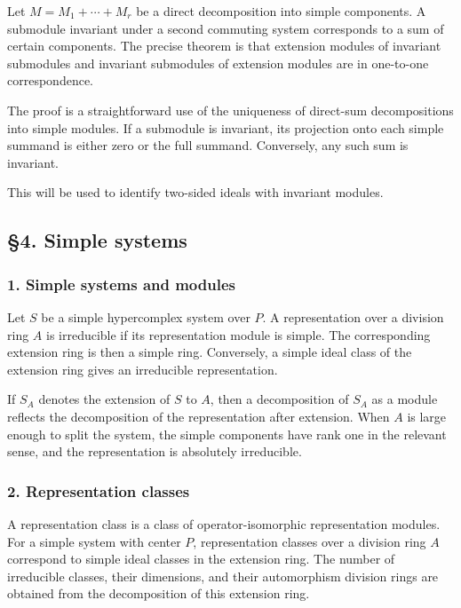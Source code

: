 \documentclass[11pt]{article}
\begin{document}
Let \(M=M_1+\cdots+M_r\) be a direct decomposition into simple
components. A submodule invariant under a second commuting system
corresponds to a sum of certain components. The precise theorem is that
extension modules of invariant submodules and invariant submodules of
extension modules are in one-to-one correspondence.

The proof is a straightforward use of the uniqueness of direct-sum
decompositions into simple modules. If a submodule is invariant, its
projection onto each simple summand is either zero or the full summand.
Conversely, any such sum is invariant.

This will be used to identify two-sided ideals with invariant modules.

\subsection{§4. Simple systems}\label{simple-systems}

\subsubsection{1. Simple systems and
modules}\label{simple-systems-and-modules}

Let \(S\) be a simple hypercomplex system over \(P\). A representation
over a division ring \(A\) is irreducible if its representation module
is simple. The corresponding extension ring is then a simple ring.
Conversely, a simple ideal class of the extension ring gives an
irreducible representation.

If \(S_A\) denotes the extension of \(S\) to \(A\), then a decomposition
of \(S_A\) as a module reflects the decomposition of the representation
after extension. When \(A\) is large enough to split the system, the
simple components have rank one in the relevant sense, and the
representation is absolutely irreducible.

\subsubsection{2. Representation classes}\label{representation-classes}

A representation class is a class of operator-isomorphic representation
modules. For a simple system with center \(P\), representation classes
over a division ring \(A\) correspond to simple ideal classes in the
extension ring. The number of irreducible classes, their dimensions, and
their automorphism division rings are obtained from the decomposition of
this extension ring.
\end{document}
